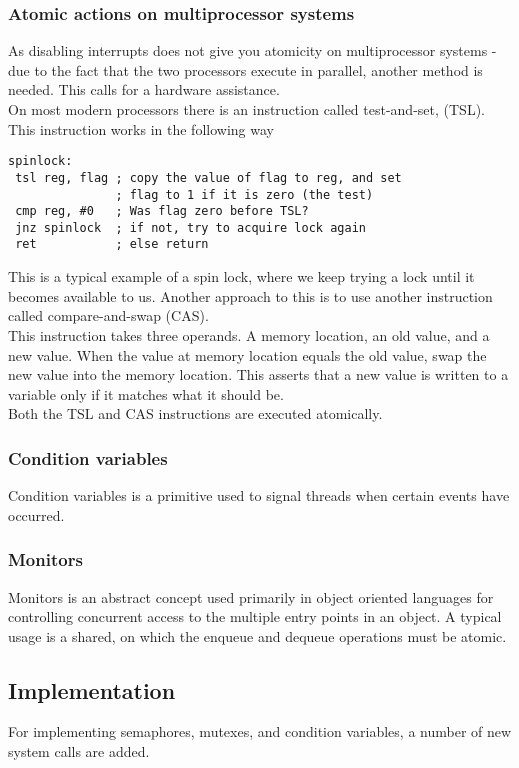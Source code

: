 \subsubsection{Atomic actions on multiprocessor systems}
As disabling interrupts does not give you atomicity on multiprocessor systems - due to the fact that the two processors execute in parallel, another method is needed. This calls for a hardware assistance.\\
On most modern processors there is an instruction called test-and-set, (TSL). This instruction works in the following way
\begin{verbatim}
spinlock:
 tsl reg, flag ; copy the value of flag to reg, and set 
               ; flag to 1 if it is zero (the test)
 cmp reg, #0   ; Was flag zero before TSL?
 jnz spinlock  ; if not, try to acquire lock again
 ret           ; else return
\end{verbatim}
This is a typical example of a spin lock, where we keep trying a lock until it becomes available to us. Another approach to this is to use another instruction called compare-and-swap (CAS).\\
This instruction takes three operands. A memory location, an old value, and a new value. When the value at memory location equals the old value, swap the new value into the memory location. This asserts that a new value is written to a variable only if it matches what it should be.\\
Both the TSL and CAS instructions are executed atomically.

\subsubsection{Condition variables}
Condition variables is a primitive used to signal threads when certain events have occurred.
\subsubsection{Monitors}
Monitors is an abstract concept used primarily in object oriented languages for controlling concurrent access to the multiple entry points in an object. A typical usage is a shared, on which the enqueue and dequeue operations must be atomic.

\subsection{Implementation}
For implementing semaphores, mutexes, and condition variables, a number of new system calls are added.
